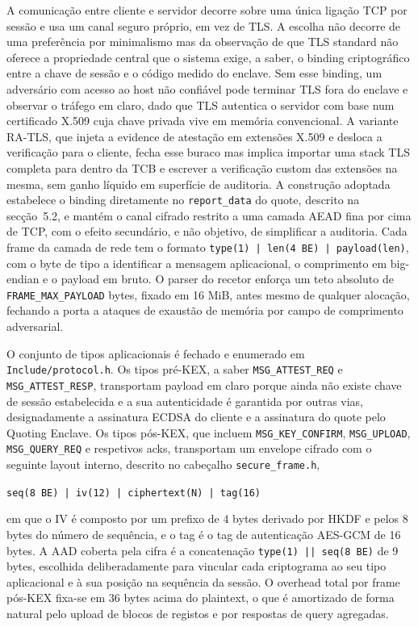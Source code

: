 A comunicação entre cliente e servidor decorre sobre uma única ligação TCP por sessão e usa um canal seguro próprio, em vez de TLS. A escolha não decorre de uma preferência por minimalismo mas da observação de que TLS standard não oferece a propriedade central que o sistema exige, a saber, o binding criptográfico entre a chave de sessão e o código medido do enclave. Sem esse binding, um adversário com acesso ao host não confiável pode terminar TLS fora do enclave e observar o tráfego em claro, dado que TLS autentica o servidor com base num certificado X.509 cuja chave privada vive em memória convencional. A variante RA-TLS, que injeta a evidence de atestação em extensões X.509 e desloca a verificação para o cliente, fecha esse buraco mas implica importar uma stack TLS completa para dentro da TCB e escrever a verificação custom das extensões na mesma, sem ganho líquido em superfície de auditoria. A construção adoptada estabelece o binding diretamente no \texttt{report\_data} do quote, descrito na secção~5.2, e mantém o canal cifrado restrito a uma camada AEAD fina por cima de TCP, com o efeito secundário, e não objetivo, de simplificar a auditoria. Cada frame da camada de rede tem o formato \texttt{type(1) | len(4 BE) | payload(len)}, com o byte de tipo a identificar a mensagem aplicacional, o comprimento em big-endian e o payload em bruto. O parser do recetor enforça um teto absoluto de \texttt{FRAME\_MAX\_PAYLOAD} bytes, fixado em 16 MiB, antes mesmo de qualquer alocação, fechando a porta a ataques de exaustão de memória por campo de comprimento adversarial.

O conjunto de tipos aplicacionais é fechado e enumerado em \texttt{Include/protocol.h}. Os tipos pré-KEX, a saber \texttt{MSG\_ATTEST\_REQ} e \texttt{MSG\_ATTEST\_RESP}, transportam payload em claro porque ainda não existe chave de sessão estabelecida e a sua autenticidade é garantida por outras vias, designadamente a assinatura ECDSA do cliente e a assinatura do quote pelo Quoting Enclave. Os tipos pós-KEX, que incluem \texttt{MSG\_KEY\_CONFIRM}, \texttt{MSG\_UPLOAD}, \texttt{MSG\_QUERY\_REQ} e respetivos acks, transportam um envelope cifrado com o seguinte layout interno, descrito no cabeçalho \texttt{secure\_frame.h},

\begin{center}
\texttt{seq(8 BE) | iv(12) | ciphertext(N) | tag(16)}
\end{center}

\noindent em que o IV é composto por um prefixo de 4 bytes derivado por HKDF e pelos 8 bytes do número de sequência, e o tag é o tag de autenticação AES-GCM de 16 bytes. A AAD coberta pela cifra é a concatenação \texttt{type(1) || seq(8 BE)} de 9 bytes, escolhida deliberadamente para vincular cada criptograma ao seu tipo aplicacional e à sua posição na sequência da sessão. O overhead total por frame pós-KEX fixa-se em 36 bytes acima do plaintext, o que é amortizado de forma natural pelo upload de blocos de registos e por respostas de query agregadas.


